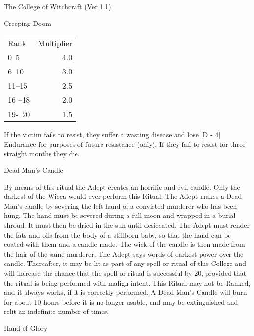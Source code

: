 \begin{Chapter}{The College of Witchcraft (Ver 1.1)}
\begin{ritual}[R-2]{Creeping Doom}
\begin{effects}
\begin{tabularx}{\columnwidth}{lr}
Rank	& Multiplier \\
0--5	& 4.0 \\
6--10	& 3.0 \\
11--15	& 2.5 \\
16-–18	& 2.0 \\
19-–20	& 1.5 \\
\end{tabularx}

If the victim fails to resist, they suffer a wasting disease and lose
[D - 4] Endurance for purposes of future resistance (only).  If they
fail to resist for three straight months they die.
\end{effects}
\end{ritual}

\begin{ritual}[R-3]{Dead Man’s Candle}

\begin{effects}
By means of this ritual the Adept creates an horrific and evil candle.
Only the darkest of the Wicca would ever perform this Ritual.  The
Adept makes a Dead Man’s candle by severing the left hand of a
convicted murderer who has been hung.  The hand must be severed during
a full moon and wrapped in a burial shroud. It must then be dried in
the sun until desiccated. The Adept must render the fats and oils from
the body of a stillborn baby, so that the hand can be coated with them
and a candle made.  The wick of the candle is then made from the hair
of the same murderer.  The Adept says words of darkest power over the
candle.  Thereafter, it may be lit as part of any spell or ritual of
this College and will increase the chance that the spell or ritual is
successful by 20, provided that the ritual is being performed with
malign intent.  This Ritual may not be Ranked, and it always works, if
it is correctly performed.  A Dead Man’s Candle will burn for about 10
hours before it is no longer usable, and may be extinguished and relit
an indefinite number of times.
\end{effects}
\end{ritual}

\begin{ritual}[R-4]{Hand of Glory}


\end{ritual}
\end{Chapter}
